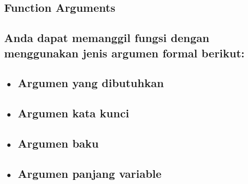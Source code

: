 \documentclass[a4paper,12pt]{report}
\begin{document}
\subsection*{Function Arguments}
 \par
\subsection*{Anda dapat memanggil fungsi dengan menggunakan jenis argumen formal berikut:}
 \par
\subsection*{ \hspace{10pt} • Argumen yang dibutuhkan}
 \par
\subsection*{ \hspace{10pt} • Argumen kata kunci}
 \par
\subsection*{ \hspace{10pt} • Argumen baku}
 \par
\subsection*{ \hspace{10pt} • Argumen panjang variable}
 \par
\vspace{12pt}
\end{document}

